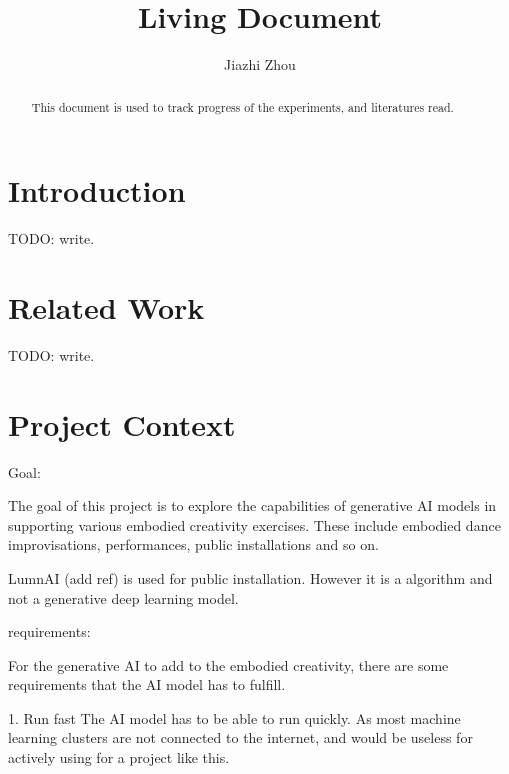 \documentclass[final,5p,times,authoryear]{article}
\begin{document}
\title{Living Document}
\author{Jiazhi Zhou}
\maketitle

\begin{abstract}

This document is used to track progress of the experiments, and literatures read.

\end{abstract}

\section{Introduction}

TODO: write.

\section{Related Work}

TODO: write.

\section{Project Context}

Goal:

The goal of this project is to explore the capabilities of generative AI models
in supporting various embodied creativity exercises. These include embodied
dance improvisations, performances, public installations and so on.

LumnAI (add ref) is used for public installation. However it is a algorithm and
not a generative deep learning model.

requirements:

For the generative AI to add to the embodied creativity, there are some
requirements that the AI model has to fulfill.

1. Run fast
The AI model has to be able to run quickly. As most machine learning clusters
are not connected to the internet, and would be useless for actively using for a
project like this.
\end{document}
